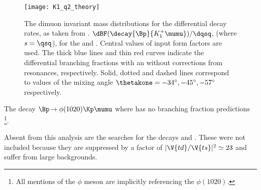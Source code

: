 \begin{figure}
  \begin{center}
    \texttt{[image: K1\_q2\_theory]}
    \caption{\small
      The dimuon invariant mass distributions for the differential decay rates, as taken from
      .
      $\dBF(\decay{\Bp}{K_1^+\mumu})/\dqsq$, (where $s=\qsq$), for the  and .
      Central values of input form factors are used.
      The thick blue lines and thin red curves indicate the differential branching fractions with
      an without corrections from resonances, respectively.
      Solid, dotted and dashed lines correspond to values of the mixing angle
      $\thetakone=-34^\circ,-45^\circ,-57^\circ$ respectively.
    }
    \label{fig:th:thetak1}
  \end{center}
\end{figure}

The decay $\Bp\!\to\phi(1020)\Kp\mumu$ where \decay{\phi}{\kk} has no branching fraction
predictions
\footnote{All mentions of the $\phi$ meson are implicitly
  referencing the $\phi(1020)$.
}.

Absent from this analysis are the searches for the decays \decay{\Bp}{\Kp\Km\pip\mumu}
and \decay{\Bp}{\pipi\pim\mumu}.
These were not included because they are suppressed by a factor of $|\V{td}/\V{ts}|^2\simeq23$ and
suffer from large backgrounds.

















%




